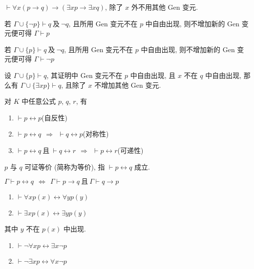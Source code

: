 \documentclass[
    mode=hazy,
    color=blue,
    device=normal,
    lang=cn
]{elegantnote}
\begin{document}
\begin{proposition}
    $\vdash \forall x(p\to q)\to (\exists xp\to \exists xq)$, 除了 $x$ 外不用其他 Gen 变元.
\end{proposition}
\begin{theorem}[反证律]
    若 $\Gamma\cup\{\lnot p\}\vdash q\ \text{及}\ \lnot q$, 且所用 Gen 变元不在 $p$ 中自由出现, 则不增加新的 Gen 变元便可得 $\Gamma \vdash p$
\end{theorem}
\begin{theorem}[归谬律]
    若 $\Gamma\cup\{p\}\vdash q\ \text{及}\ \lnot q$, 且所用 Gen 变元不在 $p$ 中自由出现, 则不增加新的 Gen 变元便可得 $\Gamma \vdash\lnot p$
\end{theorem}
\begin{proposition}[$\exists_2$ 规则]
    设 $\Gamma\cup\{p\}\vdash q$, 其证明中 Gen 变元不在 $p$ 中自由出现, 且 $x$ 不在 $q$ 中自由出现, 那么有 $\Gamma\cup\{\exists xp\}\vdash q$, 且除了 $x$ 不增加其他 Gen 变元.
\end{proposition}
\begin{proposition}
    对 $K$ 中任意公式 $p$, $q$, $r$, 有
    \begin{enumerate}[label = $\arabic*^\circ$]
        \item $\vdash p\leftrightarrow p$\hfill (自反性)
        \item $\vdash p\leftrightarrow q\ \ \Rightarrow\ \ \vdash q\leftrightarrow p$\hfill (对称性)
        \item $\vdash p\leftrightarrow q\ \text{且}\ \vdash q\leftrightarrow r\ \ \Rightarrow\ \ \vdash p\leftrightarrow r$\hfill (可递性)
    \end{enumerate}
\end{proposition}
\begin{definition}[可证等价]
    $p$ 与 $q$ 可证等价 (简称为等价), 指 $\vdash p\leftrightarrow q$ 成立.
\end{definition}
\begin{proposition}
    $\Gamma\vdash p\leftrightarrow q\ \ \Leftrightarrow\ \ \Gamma\vdash p\to q\ \text{且}\ \Gamma\vdash q\to p$
\end{proposition}
\begin{proposition}
    \hfill
    \begin{enumerate}[label = $\arabic*^\circ$]
        \item $\vdash \forall x p(x)\leftrightarrow \forall y p(y)$
        \item $\vdash \exists x p(x)\leftrightarrow \exists y p(y)$
    \end{enumerate}
    其中 $y$ 不在 $p(x)$ 中出现.
\end{proposition}
\begin{proposition}
    \hfill
    \begin{enumerate}[label = $\arabic*^\circ$]
        \item $\vdash \lnot \forall x p\leftrightarrow \exists x\lnot p$
        \item $\vdash \lnot \exists x p\leftrightarrow \forall x\lnot p$
    \end{enumerate}
\end{proposition}
\end{document}
